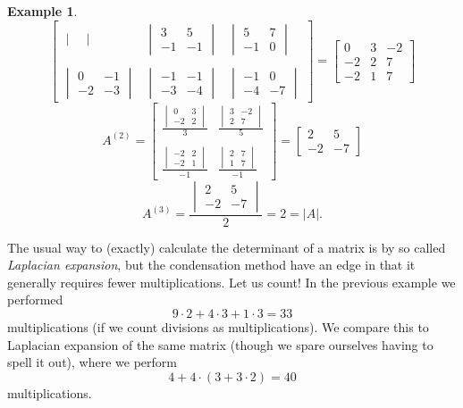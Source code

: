 \documentclass[a4paper,12pt]{book}
\theoremstyle{plain}
\theoremstyle{definition}
\newtheorem{Example}[equation]{Example}
\begin{document}
\begin{Example}
\[\begin{bmatrix}
\begin{vmatrix}
			\end{vmatrix} & \begin{vmatrix}
				3 & 5 \\ -1 & -1
			\end{vmatrix} & \begin{vmatrix}
				5 & 7 \\ -1 & 0
			\end{vmatrix} \\ & & \\ \begin{vmatrix}
				0 & -1 \\ -2 & -3
			\end{vmatrix} & \begin{vmatrix}
				-1 & -1 \\ -3 & -4
			\end{vmatrix} & \begin{vmatrix}
				-1 & 0 \\ -4 & -7
			\end{vmatrix}
		\end{bmatrix} = \begin{bmatrix}
			0 & 3 & -2 \\ -2 & 2 & 7 \\ -2 & 1 & 7
		\end{bmatrix}
	\]
	\[
		A^{(2)} = \begin{bmatrix}
			\frac{\begin{vmatrix}
				0 & 3 \\ -2 & 2
			\end{vmatrix}}{3} & \frac{\begin{vmatrix}
				3 & -2 \\ 2 & 7
			\end{vmatrix}}{5} \\ & \\ \frac{\begin{vmatrix}
				-2 & 2 \\ -2 & 1
			\end{vmatrix}}{-1} & \frac{\begin{vmatrix}
				2 & 7 \\ 1 & 7
			\end{vmatrix}}{-1}
		\end{bmatrix} = \begin{bmatrix}
			2 & 5 \\ -2 & -7
		\end{bmatrix}
	\]
	\[
		A^{(3)} = \frac{\begin{vmatrix}
			2 & 5 \\ -2 & -7
		\end{vmatrix}}{2} = 2 = |A| .
	\]
\end{Example}
The usual way to (exactly) calculate the determinant of a matrix is by so
called \emph{Laplacian expansion}, but the condensation method have an edge in 
that
it generally requires fewer multiplications. Let us count! In the previous
example we performed
\[
	9 \cdot 2 + 4 \cdot 3 + 1 \cdot 3 = 33
\]
multiplications (if we count divisions as multiplications).
We compare this to Laplacian expansion of the same matrix (though we spare
ourselves having to spell it out), where we perform
\[
	4 + 4 \cdot (3 + 3 \cdot 2) = 40
\]
multiplications.
\end{document}
